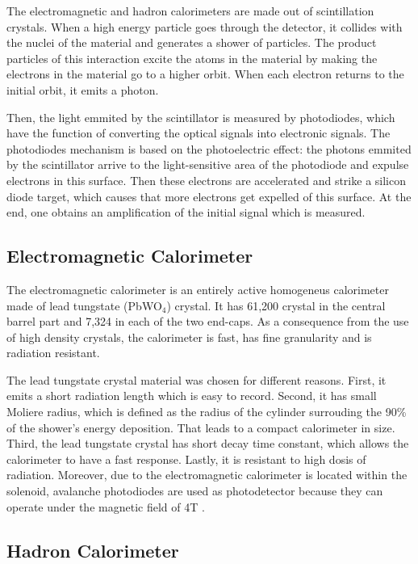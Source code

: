 The electromagnetic and hadron calorimeters are made out of scintillation crystals. When a high energy particle goes through the detector, it collides with the nuclei of the material and generates a shower of particles. The product particles of this interaction excite the atoms in the material by making the electrons in the material go to a higher orbit. When each electron returns to the initial orbit, it emits a photon. 

Then, the light emmited by the scintillator is measured by photodiodes, which have the function of converting the optical signals into electronic signals. The photodiodes mechanism is based on the photoelectric effect: the photons emmited by the scintillator arrive to the light-sensitive area of the photodiode and expulse electrons in this surface. Then these electrons are accelerated and strike a silicon diode target, which causes that more electrons get expelled of this surface. At the end, one obtains an amplification of the initial signal which is measured.

\subsection{Electromagnetic Calorimeter}

The electromagnetic calorimeter is an entirely active homogeneus calorimeter made of lead tungstate (PbWO$_4$) crystal. It has 61,200 crystal in the central barrel part and 7,324  in each of the two end-caps. As a consequence from the use of high density crystals, the calorimeter is fast, has fine granularity and is radiation resistant. 

The lead tungstate crystal material was chosen for different reasons. First, it emits a short radiation length which is easy to record. Second, it has small Moliere radius, which is defined as the radius of the cylinder surrouding the 90\% of the shower's energy deposition. That leads to a compact calorimeter in size. Third, the lead tungstate crystal has short decay time constant, which allows the calorimeter to have a fast response. Lastly, it is resistant to high dosis of radiation. Moreover, due to the electromagnetic calorimeter is located within the solenoid, avalanche photodiodes are used as photodetector because they can operate under the magnetic field of 4T \cite{Perspectives_LHC}. 

\subsection{Hadron Calorimeter}

